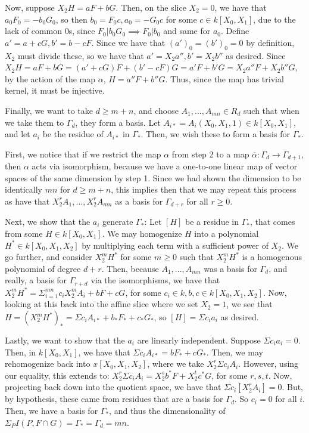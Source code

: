 \documentclass[10pt]{article}
\begin{document}
Now, suppose $X_2 H = aF + bG$. Then, on the slice $X_2 = 0$, we have that $a_0F_0 = - b_0 G_0$, so then $b_0 = F_0c, a_0 = -G_0c$ for some $c \in k[X_0,X_1]$, due to the lack of common 0s, since $F_0 | b_0 G_0 \implies F_0 | b_0$ and same for $a_0$. Define $a' = a  +cG, b' = b - cF$. Since we have that $(a')_0 = (b')_0 = 0$ by definition, $X_2$ must divide these, so we have that $a' = X_2 a'', b' = X_2 b''$ as desired. Since $X_2 H = aF + bG = (a'+cG)F + (b'-cF)G = a'F + b'G = X_2 a''F + X_2 b''G$, by the action of the map $\alpha$, $H = a''F + b''G$. Thus, since the map has trivial kernel, it must be injective.

Finally, we want to take $d \geq m + n$, and choose $A_1,...,A_{mn} \in R_d$ such that when we take them to $\Gamma_d$, they form a basis. Let $A_{i*} = A_i(X_0,X_1,1) \in k[X_0,X_1]$, and let $a_i$ be the residue of $A_{i*}$ in $\Gamma_*$. Then, we wish these to form a basis for $\Gamma_*$.

First, we notice that if we restrict the map $\alpha$ from step 2 to a map $\overline{\alpha}: \Gamma_d \to \Gamma_{d+1}$, then $\alpha$ acts via isomorphism, because we have a one-to-one linear map of vector spaces of the same dimension by step 1. Since we had shown the dimension to be identically $mn$ for $d \geq m +n$, this implies then that we may repeat this process as have that $X_2^r A_1,...,X_2^r A_{mn}$ as a basis for  $\Gamma_{d+r}$ for all $r \geq 0$.

Next, we show that the $a_i$ generate $\Gamma_*$: Let $[H]$ be a residue in $\Gamma_*$, that comes from some $H \in k[X_0,X_1]$. We may homogenize $H$ into a polynomial $H^* \in k[X_0,X_1,X_2]$ by multiplying each term with a sufficient power of $X_2$. We go further, and consider $X_2^m H^*$ for some $m \geq 0$ such that $X_2^m H^*$ is a homogenous polynomial of degree $d + r$. Then, because $A_1,... ,A_{mn}$ was a basis for $\Gamma_d$, and really, a basis for $\Gamma_{r + d}$ via the isomorphisms, we have that $X_2^m H^* = \Sigma_{i=1}^{mn} c_i X_2^m A_i + bF + cG$, for some $c_i \in k, b,c \in k[X_0,X_1,X_2]$. Now, looking at this back into the affine slice where we set $X_2 = 1$, we see that $H = (X_2^m H^*)_* = \Sigma c_i A_{i*} + b_* F_* + c_* G_*$, so $[H] = \Sigma c_i a_i$ as desired. 

Lastly, we want to show that the $a_i$ are linearly independent. Suppose $\Sigma c_i a_i = 0$. Then, in $k[X_0,X_1]$, we have that $\Sigma c_i A_{i*} = b F_* + c G_*$. Then, we may rehomogenize back into $x[X_0,X_1,X_2]$, where we take $X_2^r \Sigma c_i A_{i}$. However, using our equality, this extends to: $X_2^r \Sigma c_i A_{i} = X_2^s b^* F + X_2^ t c^* G$, for some $r,s,t$. Now, projecting back down into the quotient space, we have that $\Sigma c_i [ X_2^rA_{i}] = 0$. But, by hypothesis, these came from residues that are a basis for $\Gamma_d$. So $c_i = 0$ for all $i$. Then, we have a basis for $\Gamma_*$, and thus the dimensionality of $\Sigma_P I(P,F \cap G) = \Gamma_* = \Gamma_d = mn$.
\end{document}
